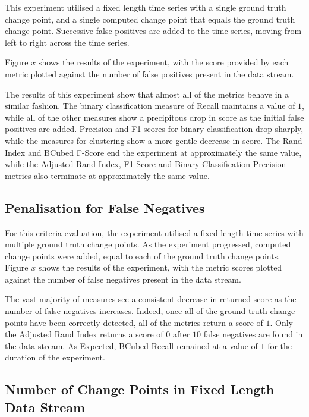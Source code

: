 \documentclass{uvamscse}	%
\begin{document}
This experiment utilised a fixed length time series with a single ground truth change point, and a single computed change point that equals the ground truth change point. Successive false positives are added to the time series, moving from left to right across the time series.

Figure $x$ shows the results of the experiment, with the score provided by each metric plotted against the number of false positives present in the data stream.


The results of this experiment show that almost all of the metrics behave in a similar fashion. The binary classification measure of Recall maintains a value of $1$, while all of the other measures  show a precipitous drop in score as the initial false positives are added. Precision and F1 scores for binary classification drop sharply, while the measures for clustering show a more gentle decrease in score. The Rand Index and BCubed F-Score end the experiment at approximately the same value, while the Adjusted Rand Index, F1 Score and Binary Classification Precision metrics also terminate at approximately the same value.

\subsection{Penalisation for False Negatives}

For this criteria evaluation, the experiment utilised a fixed length time series with multiple ground truth change points. As the experiment progressed, computed change points were added, equal to each of the ground truth change points. Figure $x$ shows the results of the experiment, with the metric scores plotted against the number of false negatives present in the data stream.


The vast majority of measures see a consistent decrease in returned score as the number of false negatives increases. Indeed, once all of the ground truth change points have been correctly detected, all of the metrics return a score of $1$. Only the Adjusted Rand Index returns a score of $0$ after $10$ false negatives are found in the data stream. As Expected, BCubed Recall remained at a value of $1$ for the duration of the experiment.

\subsection{Number of Change Points in Fixed Length Data Stream}
\end{document}
